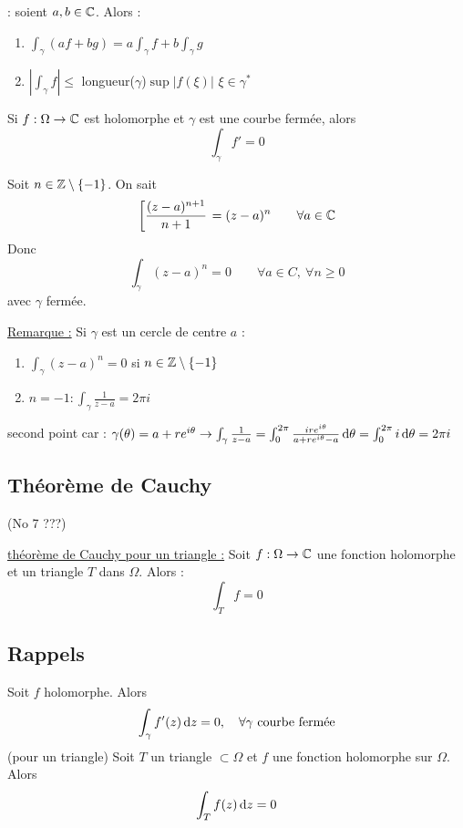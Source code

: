 \documentclass[12pt,a4paper]{article}
\begin{document}
 : soient $a,b \in \mathbb{C}$. Alors :
\begin{enumerate}
    \item $\int_\gamma (af+bg) = a\int_\gamma f + b\int_\gamma g$
    \item $|\int_\gamma f| \leq $ longueur($\gamma$)$\sup|f(\xi)|$ $\xi \in \gamma^*$
\end{enumerate}

 Si $f : \Omega \to \mathbb{C}$ est holomorphe et $\gamma$ est une courbe fermée, alors 
\begin{equation}
    \int_\gamma f' = 0     
\end{equation}

 Soit $n \in \mathbb{Z} \setminus \{-1\}$. On sait
\[\left[\frac{(z-a)^{n+1}}{n+1}\right. = (z-a)^n \qquad \forall a \in \mathbb{C}\]
Donc 
\[\int_\gamma (z-a)^n = 0 \qquad \forall a \in C,\ \forall n \geq 0\]
avec $\gamma$ fermée.

\uline{Remarque :} Si $\gamma$ est un cercle de centre $a$ :
\begin{enumerate}
    \item $\int_\gamma (z-a)^n = 0$ si $n \in \mathbb{Z} \setminus \{-1\}$
    \item $n=-1 : \int_\gamma \frac{1}{z-a} = 2\pi i$
\end{enumerate}
second point car : $\gamma(\theta) = a+re^{i\theta} \to \int_\gamma \frac{1}{z-a} = \int_0^{2\pi} \frac{ire^{i\theta}}{a+re^{i\theta} -a} \, \mathrm d \theta = \int_0^{2\pi} i\, \mathrm d \theta = 2\pi i$

\setcounter{subsection}{6}
\subsection{Théorème de Cauchy}
(No 7 ???)
\begin{boite}
     \uline{théorème de Cauchy pour un triangle :} Soit $f : \Omega \to \mathbb{C}$ une fonction holomorphe et un triangle $T$ dans $\Omega$. Alors :
    \begin{equation}
        \int_T f = 0
    \end{equation}    
\end{boite}

\subsection*{Rappels}
 Soit $f$ holomorphe. Alors 
\[\int_\gamma f'(z) \, \mathrm d z = 0,\quad \forall \gamma \text{ courbe fermée}\]
 (pour un triangle) Soit $T$ un triangle $\subset \Omega$ et $f$ une fonction holomorphe sur $\Omega$. Alors 
\[\int_T f(z) \, \mathrm d z = 0\]
\end{document}
